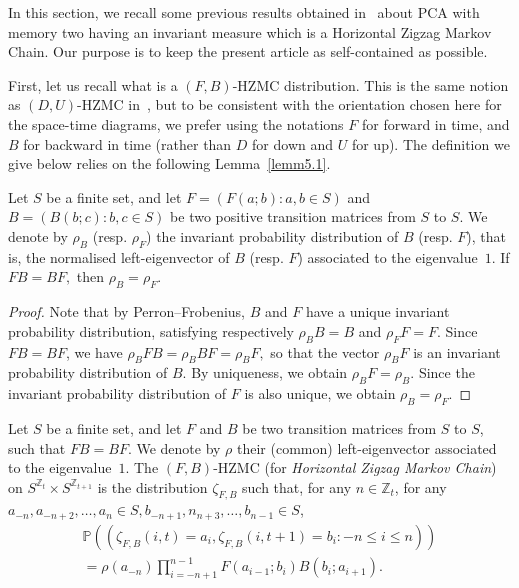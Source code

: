 \documentclass[AHL,Unicode,longabstracts]{cedram}
\newcounter{a}
\newcommand{\ZZ}{\mathbb{Z}}
\newcommand{\Pbb}{\mathbb{P}}
\begin{document}
In this section, we recall some previous results obtained in~\cite{Casse17} about PCA with memory two having an invariant measure which is a Horizontal Zigzag Markov Chain. Our purpose is to keep the present article as self-contained as possible.

First, let us recall what is a $(F,B)$-HZMC distribution. This is the same notion as $(D,U)$-HZMC in~\cite{Casse17}, but to be consistent with the orientation chosen here for the space-time diagrams, we prefer using the notations $F$ for forward in time, and $B$ for backward in time (rather than $D$ for down and $U$ for up). The definition we give below relies on the following Lemma~\ref{lemm5.1}.

\begin{lemm}\label{lemm5.1}
Let $S$ be a finite set, and let $F = (F(a;b) : a,b \in S)$ and $B = (B(b;c) : b,c \in S)$ be two positive transition matrices from $S$ to $S$. We denote by $\rho_B$ (resp. $\rho_F$) the invariant probability distribution of $B$ (resp. $F$), that is, the normalised left-eigenvector of $B$ (resp. $F$) associated to the eigenvalue~$1$. If $FB=BF,$ then $\rho_B=\rho_F$.
\end{lemm}

\begin{proof}
Note that by Perron--Frobenius, $B$ and $F$ have a unique invariant probability distribution, satisfying respectively $\rho_BB=B$ and $\rho_F F=F$. Since $FB=BF$, we have $ \rho_B FB = \rho_B B F = \rho_B F,$ so that the vector $\rho_B F$ is an invariant probability distribution of $B$. By uniqueness, we obtain $\rho_B F = \rho_B$. Since the invariant probability distribution of $F$ is also unique, we obtain $\rho_B=\rho_F$.
\end{proof}

\begin{defi}\label{def:hzmc}
Let $S$ be a finite set, and let $F$ and $B$ be two transition matrices from $S$ to $S$, such that $FB=BF$. We denote by $\rho$ their (common) left-eigenvector associated to the eigenvalue~$1$. The $(F,B)$-HZMC (for \emph{Horizontal Zigzag Markov Chain}) on $S^{\ZZ_{t}} \times S^{\ZZ_{t+1}}$ is the distribution $\zeta_{F,B}$ such that, for any $n \in \ZZ_t$, for any $a_{-n},a_{-n+2},\ldots,a_n \in S, b_{-n+1},n_{n+3},\ldots,b_{n-1} \in S$,
\begin{multline*}
\Pbb\left((\zeta_{F,B}(i,t)= a_i, \zeta_{F,B}(i,t+1) = b_i :-n\leq i\leq n)\right) \\
 = \rho(a_{-n}) \prod_{i=-n+1}^{n-1} F(a_{i-1};b_i) B(b_i;a_{i+1}).
\end{multline*}
\end{defi}
\end{document}
